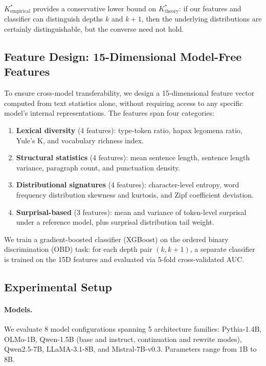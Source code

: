 \documentclass[11pt,a4paper]{article}
\begin{document}
$K^*_{\text{empirical}}$ provides a conservative lower bound on $K^*_{\text{theory}}$: if our features and classifier can distinguish depths $k$ and $k{+}1$, then the underlying distributions are certainly distinguishable, but the converse need not hold.

\subsection{Feature Design: 15-Dimensional Model-Free Features}

To ensure cross-model transferability, we design a 15-dimensional feature vector computed from text statistics alone, without requiring access to any specific model's internal representations. The features span four categories:

\begin{enumerate}
    \item \textbf{Lexical diversity} (4 features): type-token ratio, hapax legomena ratio, Yule's K, and vocabulary richness index.
    \item \textbf{Structural statistics} (4 features): mean sentence length, sentence length variance, paragraph count, and punctuation density.
    \item \textbf{Distributional signatures} (4 features): character-level entropy, word frequency distribution skewness and kurtosis, and Zipf coefficient deviation.
    \item \textbf{Surprisal-based} (3 features): mean and variance of token-level surprisal under a reference model, plus surprisal distribution tail weight.
\end{enumerate}

We train a gradient-boosted classifier (XGBoost) on the ordered binary discrimination (OBD) task: for each depth pair $(k, k{+}1)$, a separate classifier is trained on the 15D features and evaluated via 5-fold cross-validated AUC.

\subsection{Experimental Setup}

\paragraph{Models.} We evaluate 8 model configurations spanning 5 architecture families: Pythia-1.4B, OLMo-1B, Qwen-1.5B (base and instruct, continuation and rewrite modes), Qwen2.5-7B, LLaMA-3.1-8B, and Mistral-7B-v0.3. Parameters range from 1B to 8B.
\end{document}
